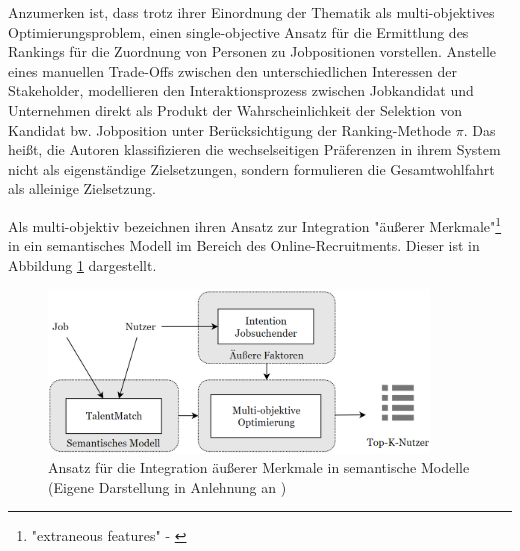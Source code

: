 Anzumerken ist, dass \textcite[S. 328ff.]{su:inproceedings} trotz ihrer Einordnung der Thematik als multi-objektives Optimierungsproblem, einen single-objective Ansatz für die Ermittlung des Rankings für die Zuordnung von Personen zu Jobpositionen vorstellen.
Anstelle eines manuellen Trade-Offs zwischen den unterschiedlichen Interessen der Stakeholder, modellieren \textcite[S. 329]{su:inproceedings} den Interaktionsprozess zwischen Jobkandidat und Unternehmen direkt als Produkt der Wahrscheinlichkeit der Selektion von Kandidat bw. Jobposition unter Berücksichtigung der Ranking-Methode $\pi$.
Das heißt, die Autoren klassifizieren die wechselseitigen Präferenzen in ihrem System nicht als eigenständige Zielsetzungen, sondern formulieren die Gesamtwohlfahrt als alleinige Zielsetzung.


Als multi-objektiv bezeichnen \textcite[S. 12]{rodriguez:inproceedings} ihren Ansatz zur Integration "äußerer Merkmale"\footnote{"extraneous features" - \textcite[S. 12]{rodriguez:inproceedings}} in ein semantisches Modell im Bereich des Online-Recruitments. 
Dieser ist in Abbildung \ref{fig:relatedwork:abb1} dargestellt.

\begin{figure}[H]
    \centering
	\includegraphics[width=0.9\textwidth]{gfx/talentMatch.png}
	\caption[Ansatz für die Integration äußerer Merkmale in semantische Modelle]{Ansatz für die Integration äußerer Merkmale in semantische Modelle\\
    (Eigene Darstellung in Anlehnung an \cite[S. 12]{rodriguez:inproceedings})}
	\label{fig:relatedwork:abb1}
\end{figure}

